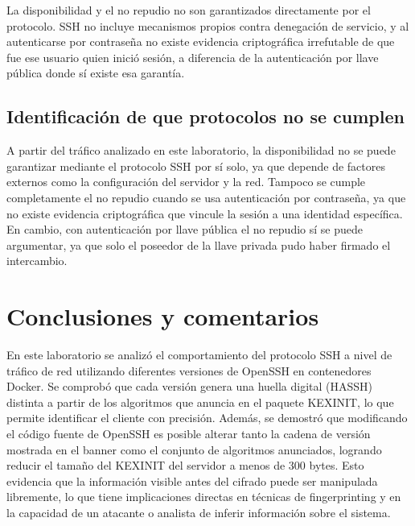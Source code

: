 \documentclass[letter,12pt]{article}
\begin{document}
La disponibilidad y el no repudio no son garantizados directamente por el protocolo.
SSH no incluye mecanismos propios contra denegación de servicio, y al autenticarse
por contraseña no existe evidencia criptográfica irrefutable de que fue ese usuario
quien inició sesión, a diferencia de la autenticación por llave pública donde sí
existe esa garantía.

\subsection{Identificación de que protocolos no se cumplen}

A partir del tráfico analizado en este laboratorio, la disponibilidad no se puede
garantizar mediante el protocolo SSH por sí solo, ya que depende de factores externos
como la configuración del servidor y la red. Tampoco se cumple completamente el no
repudio cuando se usa autenticación por contraseña, ya que no existe evidencia
criptográfica que vincule la sesión a una identidad específica. En cambio, con
autenticación por llave pública el no repudio sí se puede argumentar, ya que solo
el poseedor de la llave privada pudo haber firmado el intercambio.

\section*{Conclusiones y comentarios}

En este laboratorio se analizó el comportamiento del protocolo SSH a nivel de tráfico
de red utilizando diferentes versiones de OpenSSH en contenedores Docker. Se comprobó
que cada versión genera una huella digital (HASSH) distinta a partir de los algoritmos
que anuncia en el paquete KEXINIT, lo que permite identificar el cliente con precisión.
Además, se demostró que modificando el código fuente de OpenSSH es posible alterar
tanto la cadena de versión mostrada en el banner como el conjunto de algoritmos
anunciados, logrando reducir el tamaño del KEXINIT del servidor a menos de 300 bytes.
Esto evidencia que la información visible antes del cifrado puede ser manipulada
libremente, lo que tiene implicaciones directas en técnicas de fingerprinting y
en la capacidad de un atacante o analista de inferir información sobre el sistema.
\end{document}
